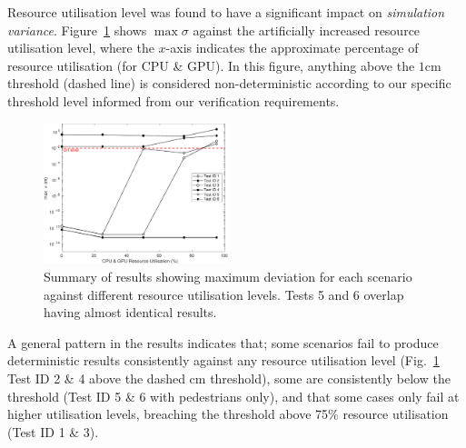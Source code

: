 \documentclass[letterpaper, 10 pt, journal, twoside]{IEEEtran}
\begin{document}
Resource utilisation level was found to have a significant impact on \textit{simulation variance}.
%
Figure~\ref{ExperimentsStressSummary} shows $\max\sigma$ against the artificially increased resource utilisation level, where the $x$-axis indicates the approximate percentage of resource utilisation (for CPU \& GPU). In this figure, anything above the $1$cm threshold (dashed line) is considered non-deterministic according to our specific threshold level informed from our verification requirements.
%
%

\begin{figure}[!t]
    \centering
    \includegraphics[width=0.48\textwidth]{Other/Figures/ExperimentsStressSummaryV4.pdf}
    \caption{Summary of results showing maximum deviation for each scenario against different resource utilisation levels. Tests 5 and 6 overlap having almost identical results.}
    \label{ExperimentsStressSummary}
\end{figure}

A general pattern in the results indicates that; some scenarios fail to produce deterministic results consistently against any resource utilisation level (Fig.~\ref{ExperimentsStressSummary} Test ID 2 \& 4 above the dashed cm threshold), some are consistently below the threshold (Test ID 5 \& 6 with pedestrians only), and that some cases only fail at higher utilisation levels, breaching the threshold above 75\% resource utilisation (Test ID 1 \& 3).

\end{document}
